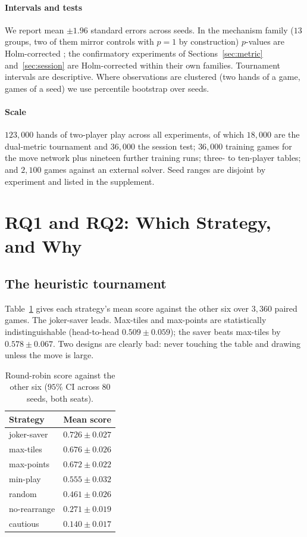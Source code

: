\documentclass[10pt,journal,compsoc]{IEEEtran}
\begin{document}
\paragraph*{Intervals and tests}
We report mean $\pm 1.96$ standard errors across seeds. In the mechanism family ($13$ groups, two of them mirror controls with $p=1$ by construction) $p$-values are Holm-corrected \cite{holm1979}; the confirmatory experiments of Sections~\ref{sec:metric} and~\ref{sec:session} are Holm-corrected within their own families. Tournament intervals are descriptive. Where observations are clustered (two hands of a game, games of a seed) we use percentile bootstrap over seeds.

\paragraph*{Scale}
$123{,}000$ hands of two-player play across all experiments, of which $18{,}000$ are the dual-metric tournament and $36{,}000$ the session test; $36{,}000$ training games for the move network plus nineteen further training runs; three- to ten-player tables; and $2{,}100$ games against an external solver. Seed ranges are disjoint by experiment and listed in the supplement.

\section{RQ1 and RQ2: Which Strategy, and Why}
\subsection{The heuristic tournament}
Table~\ref{tab:ranking} gives each strategy's mean score against the other six over $3{,}360$ paired games. The joker-saver leads. Max-tiles and max-points are statistically indistinguishable (head-to-head $0.509\pm0.059$); the saver beats max-tiles by $0.578\pm0.067$. Two designs are clearly bad: never touching the table and drawing unless the move is large.
\begin{table}[t]\centering\small
\caption{Round-robin score against the other six ($95\%$ CI across $80$ seeds, both seats).}\label{tab:ranking}
\begin{tabular}{@{}lc@{}}\toprule
Strategy & Mean score \\\midrule
joker-saver & $0.726\pm0.027$\\
max-tiles & $0.676\pm0.026$\\
max-points & $0.672\pm0.022$\\
min-play & $0.555\pm0.032$\\
random & $0.461\pm0.026$\\
no-rearrange & $0.271\pm0.019$\\
cautious & $0.140\pm0.017$\\\bottomrule
\end{tabular}
\end{table}
\end{document}
